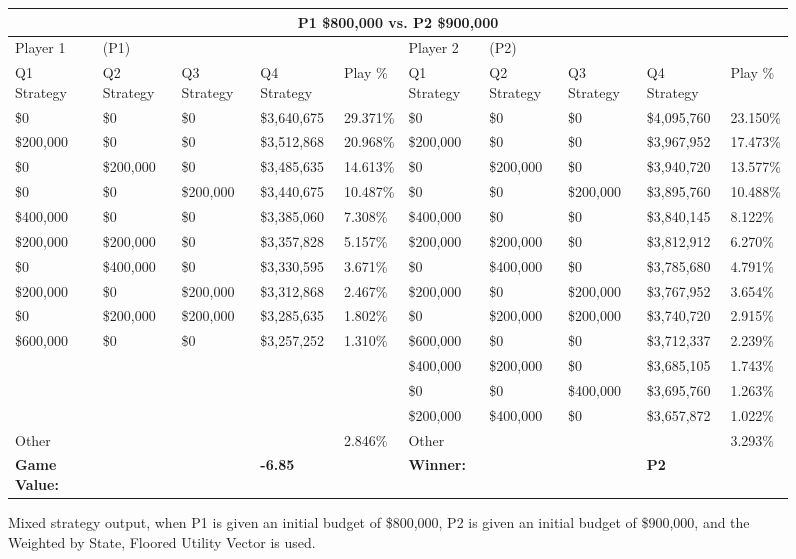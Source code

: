 \documentclass[11pt]{article}
\begin{document}
\begin{figure}
\tiny
\begin{tabular}{ |p{1.0cm}p{1.0cm}p{1.0cm}p{2.0cm}|p{1.0cm}||p{1.0cm}p{1.0cm}p{1.0cm}p{2.0cm}|p{1.0cm}|}
\hline
\multicolumn{10}{|c|}{P1 \$800,000 vs. P2 \$900,000} \\
\hline
Player 1 & (P1) & & & & Player 2 & (P2) & & & \\
\hline
Q1 Strategy & Q2 Strategy & Q3 Strategy & Q4 Strategy  &  Play \% & Q1 Strategy & Q2 Strategy & Q3 Strategy & Q4 Strategy  &  Play \%\\
\hline
\$0 & \$0 & \$0 & \$3,640,675  & 29.371\%           & \$0 & \$0 & \$0 & \$4,095,760  & 23.150\% \\
\$200,000 & \$0 & \$0 & \$3,512,868  & 20.968\%     & \$200,000 & \$0 & \$0 & \$3,967,952  & 17.473\% \\
\$0& \$200,000 & \$0 & \$3,485,635  & 14.613\%      & \$0& \$200,000 & \$0 & \$3,940,720  & 13.577\% \\
\$0 & \$0& \$200,000 & \$3,440,675  & 10.487\%      & \$0 & \$0& \$200,000 & \$3,895,760  & 10.488\% \\
\$400,000 & \$0 & \$0 & \$3,385,060  & 7.308\%      & \$400,000 & \$0 & \$0 & \$3,840,145  & 8.122\% \\
\$200,000& \$200,000 & \$0 & \$3,357,828  & 5.157\% & \$200,000& \$200,000 & \$0 & \$3,812,912  & 6.270\% \\
\$0& \$400,000 & \$0 & \$3,330,595  & 3.671\%       & \$0& \$400,000 & \$0 & \$3,785,680  & 4.791\% \\
\$200,000 & \$0& \$200,000 & \$3,312,868  & 2.467\% & \$200,000 & \$0& \$200,000 & \$3,767,952  & 3.654\% \\
\$0& \$200,000& \$200,000 & \$3,285,635  & 1.802\%  & \$0& \$200,000& \$200,000 & \$3,740,720  & 2.915\% \\
\$600,000 & \$0 & \$0 & \$3,257,252  & 1.310\%       & \$600,000 & \$0 & \$0 & \$3,712,337  & 2.239\% \\
&&&&                                                & \$400,000& \$200,000 & \$0 & \$3,685,105  & 1.743\% \\
&&&&                                                & \$0 & \$0& \$400,000 & \$3,695,760  & 1.263\% \\
&&&&                                                & \$200,000& \$400,000 & \$0 & \$3,657,872  & 1.022\% \\
\hline
Other &&&& 2.846\% & Other &&&& 3.293\% \\
\hline
\small \textbf{Game Value:} &&& \small \textbf{-6.85} && \small \textbf{Winner:} &&& \small \textbf{P2}&\\
\hline
\end{tabular}
\caption{Mixed strategy output, when P1 is given an initial budget of \$800,000, P2 is given an initial budget of \$900,000, and the Weighted by State, Floored Utility Vector is used.}
\label{8v9table.2}
\end{figure}
\end{document}
